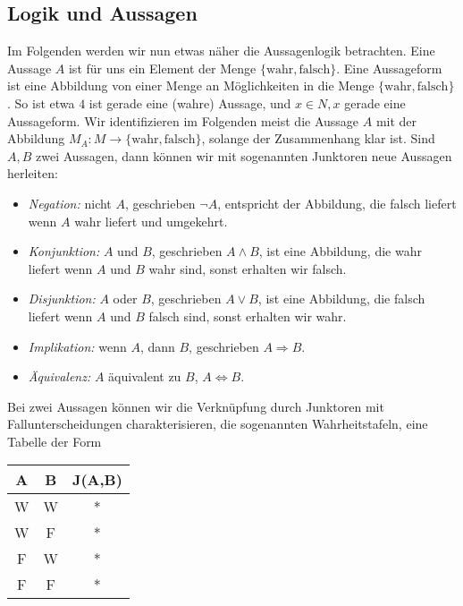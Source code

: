 \subsection{Logik und Aussagen}
\label{\detokenize{grundlagen/mengenlogik:logik-und-aussagen}}
Im Folgenden werden wir nun etwas näher die Aussagenlogik betrachten. Eine Aussage \(A\) ist für uns ein Element der Menge \(\{\text{wahr},\text{falsch}\}\). Eine Aussageform ist eine Abbildung von einer Menge an Möglichkeiten in die Menge \(\{\text{wahr},\text{falsch}\}\). So ist etwa \(4\) ist gerade eine (wahre) Aussage, und \(x \in N, x\) gerade eine Aussageform. Wir identifizieren im Folgenden meist die Aussage \(A\) mit der Abbildung \(M_A:M \rightarrow \{\text{wahr},\text{falsch}\}\), solange der Zusammenhang klar ist.
Sind \(A,B\) zwei Aussagen, dann können wir mit sogenannten Junktoren neue Aussagen herleiten:
\begin{itemize}
\item {} 
\emph{Negation:} nicht \(A\), geschrieben \(\lnot A\), entspricht der Abbildung, die falsch liefert wenn \(A\) wahr liefert und umgekehrt.

\item {} 
\emph{Konjunktion:} \(A\) und \(B\), geschrieben \(A \land B\), ist eine Abbildung, die wahr liefert wenn \(A\) und \(B\) wahr sind, sonst erhalten wir falsch.

\item {} 
\emph{Disjunktion:} \(A\) oder \(B\), geschrieben \(A \lor B\), ist eine Abbildung, die falsch liefert wenn \(A\) und \(B\) falsch sind, sonst erhalten wir wahr.

\item {} 
\emph{Implikation:} wenn \(A\), dann \(B\), geschrieben \(A \Rightarrow B\).

\item {} 
\emph{Äquivalenz:} \(A\) äquivalent zu \(B\), \(A \Leftrightarrow B\).

\end{itemize}

Bei zwei Aussagen können wir die Verknüpfung durch Junktoren mit Fallunterscheidungen charakterisieren, die sogenannten Wahrheitstafeln, eine Tabelle der Form


\begin{center}
\centering
\begin{tabularx}{\linewidth}[{\linewidth}]{|c|c|c|}\hline
 
A
& 
B
& 
J(A,B)
\\
\hline
W
&
W
&
*
\\
\hline
W
&
F
&
*
\\
\hline
F
&
W
&
*
\\
\hline
F
&
F
&
*
\\
\hline
\end{tabularx}
\end{center}

